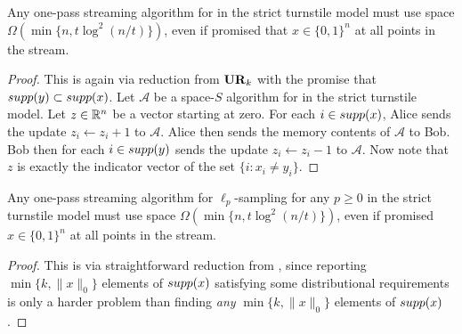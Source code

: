 \begin{corollary}
Any one-pass streaming algorithm for  in the strict turnstile model must use space $\Omega(\min\{n, t\log^2(n/t)\})$, even if promised that $x\in\{0,1\}^n$ at all points in the stream.
\end{corollary}
\begin{proof}
This is again via reduction from $\mathbf{UR}_k$ with the promise that $\mathop{supp}(y)\subset\mathop{supp}(x)$. Let $\mathcal{A}$ be a space-$S$ algorithm for  in the strict turnstile model. Let $z\in\mathbb{R}^n$ be a vector starting at zero. For each $i\in\mathop{supp}(x)$, Alice sends the update $z_i \leftarrow z_i + 1$ to $\mathcal{A}$. Alice then sends the memory contents of $\mathcal{A}$ to Bob. Bob then for each $i\in\mathop{supp}(y)$ sends the update $z_i\leftarrow z_i - 1$ to $\mathcal{A}$. Now note that $z$ is exactly the indicator vector of the set $\{i : x_i\neq y_i\}$.
\end{proof}

\begin{corollary}
Any one-pass streaming algorithm for $\ell_p$-sampling for any $p\ge 0$ in the strict turnstile model must use space $\Omega(\min\{n, t\log^2(n/t)\})$, even if promised $x\in\{0,1\}^n$ at all points in the stream.
\end{corollary}
\begin{proof}
This is via straightforward reduction from , since reporting $\min\{k,\|x\|_0\}$ elements of $\mathop{supp}(x)$ satisfying some distributional requirements is only a harder problem than finding {\em any} $\min\{k,\|x\|_0\}$ elements of $\mathop{supp}(x)$.
\end{proof}

